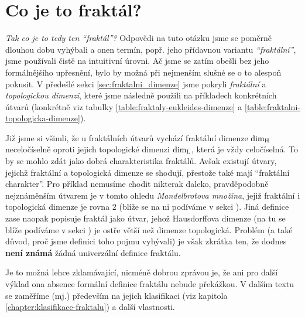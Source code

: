 \section{Co je to fraktál?}\label{sec:co-je-to-fraktal}
\emph{Tak co je to tedy ten ``fraktál''?} Odpovědi na tuto otázku jsme se poměrně dlouhou dobu vyhýbali a onen termín, popř. jeho přídavnou variantu \emph{``fraktální''}, jsme používali čistě na intuitivní úrovni. Ač jsme se zatím obešli bez jeho formálnějšího upřesnění, bylo by možná při nejmenším slušné se o to alespoň pokusit. V předešlé sekci \ref{sec:fraktalni_dimenze} jsme pokryli \emph{fraktální} a \emph{topologickou dimenzi}, které jsme následně použili na příkladech konkrétních útvarů (konkrétně viz tabulky \ref{table:fraktaly-eukleides-dimenze} a \ref{table:fraktalni-topologicka-dimenze}).

Již jsme si všimli, že u fraktálních útvarů vychází fraktální dimenze $\operatorname{dim_H}$ neceločíselně oproti jejich topologické dimenzi $\operatorname{dim_L}$, která je vždy celočíselná. To by se mohlo zdát jako dobrá charakteristika fraktálů. Avšak existují útvary, jejichž fraktální a topologická dimenze se shodují, přestože také mají ``fraktální charakter''. Pro příklad nemusíme chodit nikterak daleko, pravděpodobně nejznáměnším útvarem je v tomto ohledu \emph{Mandelbrotova množina}, jejiž fraktální i topologická dimenze je rovna $2$ (blíže se na ni podíváme v sekci ). Jiná definice zase naopak popisuje fraktál jako útvar, jehož Hausdorffova dimenze (na tu se blíže podíváme v sekci ) je ostře větší než dimenze topologická. Problém (a také důvod, proč jsme definici toho pojmu vyhývali) je však zkrátka ten, že dodnes \textbf{není známá} žádná univerzální definice fraktálu. \cite[str. 226]{Voracova2022}

Je to možná lehce zklamávající, nicméně dobrou zprávou je, že ani pro další výklad ona absence formální definice fraktálu nebude překážkou. V dalším textu se zaměříme (mj.) především na jejich klasifikaci (viz kapitola \ref{chapter:klasifikace-fraktalu}) a další vlastnosti.